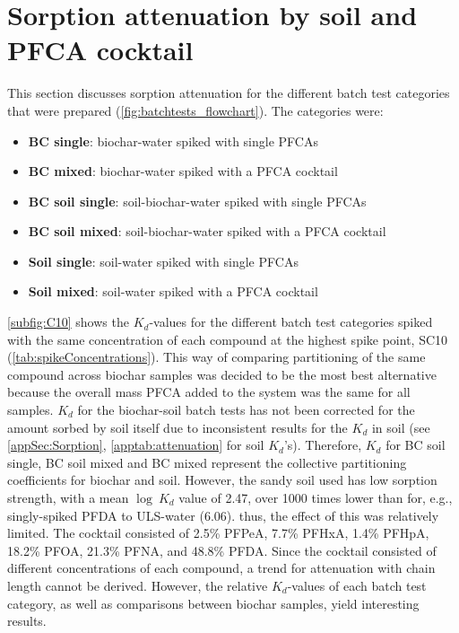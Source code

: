 
\section{Sorption attenuation by soil and PFCA cocktail}
This section discusses sorption attenuation for the different batch test categories that were prepared (\cref{fig:batchtests_flowchart}). The categories were: 

\begin{itemize}
    \item \textbf{BC single}: biochar-water spiked with single PFCAs
    \item \textbf{BC mixed}: biochar-water spiked with a PFCA cocktail
    \item \textbf{BC soil single}: soil-biochar-water spiked with single PFCAs
    \item \textbf{BC soil mixed}: soil-biochar-water spiked with a PFCA cocktail
    \item \textbf{Soil single}: soil-water spiked with single PFCAs
    \item \textbf{Soil mixed}: soil-water spiked with a PFCA cocktail
\end{itemize}

\cref{subfig:C10} shows the $K_d$-values for the different batch test categories spiked with the same concentration of each compound at the highest spike point, SC10 (\cref{tab:spikeConcentrations}). This way of comparing partitioning of the same compound across biochar samples was decided to be the most best alternative because the overall mass PFCA added to the system was the same for all samples. $K_d$ for the biochar-soil batch tests has not been corrected for the amount sorbed by soil itself due to inconsistent results for the $K_d$ in soil (see \cref{appSec:Sorption}, \cref{apptab:attenuation} for soil $K_d$'s). Therefore, $K_d$ for BC soil single, BC soil mixed and BC mixed represent the collective partitioning coefficients for biochar and soil. However, the sandy soil used has low sorption strength, with a mean $\log~K_d$ value of 2.47, over 1000 times lower than for, e.g., singly-spiked PFDA to ULS-water (6.06). thus, the effect of this was relatively limited. The cocktail consisted of 2.5\% PFPeA, 7.7\% PFHxA, 1.4\% PFHpA, 18.2\% PFOA, 21.3\% PFNA, and 48.8\% PFDA. Since the cocktail consisted of different concentrations of each compound, a trend for attenuation with chain length cannot be derived. However, the relative $K_d$-values of each batch test category, as well as comparisons between biochar samples, yield interesting results. 

